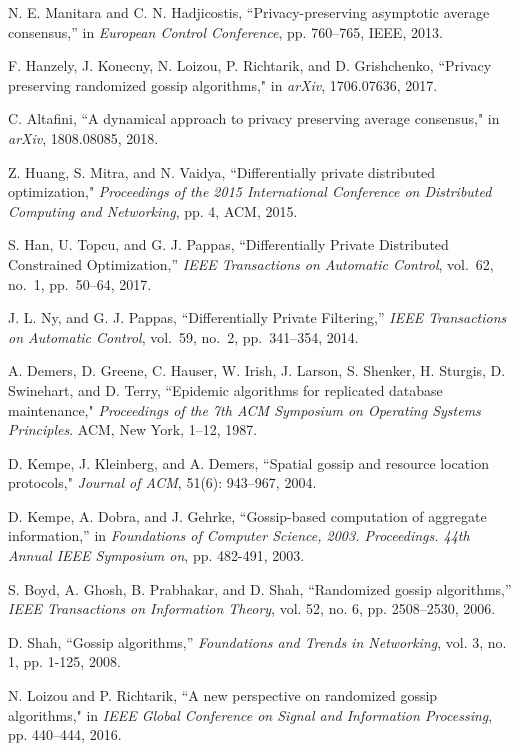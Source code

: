 \documentclass[a4paper, 11pt]{article}
\newcommand{\1}{\mathbf{1}}
\begin{document}
\begin{thebibliography}{1}
N. E. Manitara and C. N. Hadjicostis, ``Privacy-preserving asymptotic average
consensus,'' in {\em European Control Conference}, pp. 760--765,
IEEE, 2013.


F. Hanzely, J. Konecny, N. Loizou, P. Richtarik, and D. Grishchenko, ``Privacy preserving randomized gossip algorithms," in {\em arXiv}, 1706.07636, 2017.

C. Altafini, ``A dynamical approach to privacy preserving average consensus," in {\em arXiv}, 1808.08085, 2018.


Z. Huang, S. Mitra, and N. Vaidya,
``Differentially private distributed optimization,"
{\em Proceedings of the 2015 International Conference on Distributed Computing and Networking}, pp. 4, ACM, 2015.

S. Han, U. Topcu, and G. J. Pappas, ``Differentially Private Distributed
Constrained Optimization,''  {\em IEEE Transactions on Automatic Control}, vol.~62, no.~1,
pp.~50--64, 2017.

J. L. Ny, and G. J. Pappas, ``Differentially Private Filtering,''  {\em IEEE Transactions on Automatic Control}, vol.~59, no.~2,
pp.~341--354, 2014. 

 A. Demers, D. Greene, C. Hauser, W. Irish, J. Larson, S. Shenker, H. Sturgis, D. Swinehart, and
D. Terry, ``Epidemic algorithms for replicated database maintenance," {\em Proceedings of the 7th
ACM Symposium on Operating Systems Principles}. ACM, New York, 1--12, 1987.


 D. Kempe, J. Kleinberg, and A. Demers, ``Spatial gossip and resource location protocols," {\em Journal of  ACM}, 51(6): 943--967, 2004.


D. Kempe, A. Dobra, and J. Gehrke, ``Gossip-based computation of
aggregate information,'' in {\em Foundations of Computer Science, 2003. Proceedings. 44th Annual IEEE Symposium on},   pp.
482-491, 2003.

S. Boyd, A. Ghosh, B. Prabhakar, and D. Shah, ``Randomized gossip algorithms,''
{\em IEEE Transactions on Information Theory}, vol. 52, no. 6,
pp. 2508--2530, 2006.


 D. Shah, ``Gossip algorithms,'' {\em Foundations and Trends{\textregistered} in Networking}, vol. 3, no. 1,
pp. 1-125, 2008.

N. Loizou and P. Richtarik, ``A new perspective on randomized gossip algorithms," in {\em IEEE Global Conference on Signal and Information Processing}, pp. 440--444, 2016.



\end{thebibliography}
\end{document}
